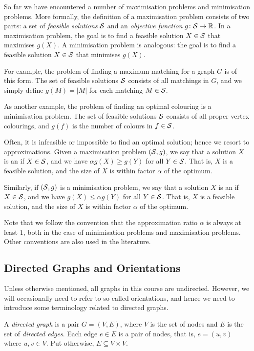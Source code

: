 So far we have encountered a number of maximisation problems and minimisation problems. More formally, the definition of a maximisation problem consists of two parts: a set of \emph{feasible solutions} $\mathcal{S}$ and an \emph{objective function} $g\colon \mathcal{S} \to \mathbb{R}$. In a maximisation problem, the goal is to find a feasible solution $X \in \mathcal{S}$ that maximises $g(X)$. A minimisation problem is analogous: the goal is to find a feasible solution $X \in \mathcal{S}$ that minimises $g(X)$.

For example, the problem of finding a maximum matching for a graph $G$ is of this form. The set of feasible solutions $\mathcal{S}$ consists of all matchings in $G$, and we simply define $g(M) = |M|$ for each matching $M \in \mathcal{S}$.

As another example, the problem of finding an optimal colouring is a minimisation problem. The set of feasible solutions $\mathcal{S}$ consists of all proper vertex colourings, and $g(f)$ is the number of colours in $f \in \mathcal{S}$.

Often, it is infeasible or impossible to find an optimal solution; hence we resort to approximations. Given a maximisation problem $(\mathcal{S},g)$, we say that a solution $X$ is an \emph{\Apx{\alpha}} if $X \in \mathcal{S}$, and we have $\alpha g(X) \ge g(Y)$ for all $Y \in \mathcal{S}$. That is, $X$ is a feasible solution, and the size of $X$ is within factor $\alpha$ of the optimum.

Similarly, if $(\mathcal{S},g)$ is a minimisation problem, we say that a solution $X$ is an \Apx{\alpha} if $X \in \mathcal{S}$, and we have $g(X) \le \alpha g(Y)$ for all $Y \in \mathcal{S}$. That is, $X$ is a feasible solution, and the size of $X$ is within factor $\alpha$ of the optimum.

Note that we follow the convention that the approximation ratio $\alpha$ is always at least $1$, both in the case of minimisation problems and maximisation problems. Other conventions are also used in the literature.


\subsection{Directed Graphs and Orientations}

Unless otherwise mentioned, all graphs in this course are undirected. However, we will occasionally need to refer to so-called orientations, and hence we need to introduce some terminology related to directed graphs.

A \emph{directed graph} is a pair $G = (V,E)$, where $V$ is the set of nodes and $E$ is the set of \emph{directed edges}. Each edge $e \in E$ is a pair of nodes, that is, $e = (u,v)$ where $u, v \in V$. Put otherwise, $E \subseteq V \times V$.


